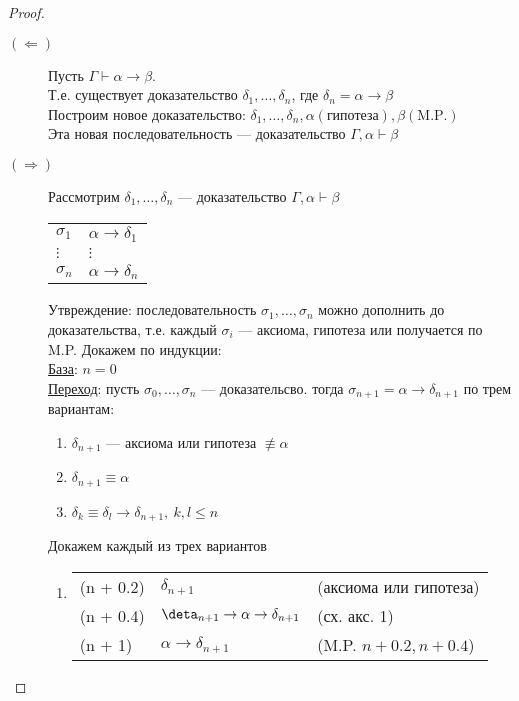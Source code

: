 \documentclass[oneside]{book}
\theoremstyle{plain}
\theoremstyle{remark}
\theoremstyle{definition}
\begin{document}
\begin{proof}
\-
\begin{description}
\item[{\((\Leftarrow)\)}] Пусть \(\Gamma \vdash \alpha \to \beta\). \\
Т.е. существует доказательство \(\delta_1, \dots, \delta_n\), где \(\delta_n = \alpha \to \beta\) \\
Построим новое доказательство: \(\delta_1, \dots, \delta_n, \alpha(\text{гипотеза}), \beta(\text{M.P.})\) \\
Эта новая последовательность --- доказательство \(\Gamma, \alpha \vdash \beta\)
\item[{\((\Rightarrow)\)}] Рассмотрим \(\delta_1, \dots, \delta_n\) --- доказательство \(\Gamma, \alpha \vdash \beta\)
\begin{center}
\begin{tabular}{ll}
\(\sigma_1\) & \(\alpha \to \delta_1\)\\
\(\vdots\) & \(\vdots\)\\
\(\sigma_n\) & \(\alpha \to \delta_n\)\\
\end{tabular}
\end{center}
Утвреждение: последовательность \(\sigma_1, \dots, \sigma_n\) можно дополнить до доказательства, т.е. каждый \(\sigma_i\) --- аксиома, гипотеза или получается по M.P. Докажем по индукции: \\
\uline{База}: \(n = 0\) \\
\uline{Переход}: пусть \(\sigma_0, \dots, \sigma_n\) --- доказательсво. тогда \(\sigma_{n + 1} = \alpha \to \delta_{n + 1}\) по трем вариантам:
\begin{enumerate}
\item \(\delta_{n + 1}\) --- аксиома или гипотеза \(\not\equiv \alpha\)
\item \(\delta_{n + 1} \equiv \alpha\)
\item \(\delta_k \equiv \delta_l \to \delta_{n + 1},\ k,l\le n\)
\end{enumerate}
Докажем каждый из трех вариантов
\begin{enumerate}
\item \-
\begin{center}
\begin{tabular}{l|ll}
(n + 0.2) & \(\delta_{n + 1}\) & (аксиома или гипотеза)\\
(n + 0.4) & \(\deta_{n + 1} \to \alpha \to \delta_{n + 1}\) & (сх. акс. 1)\\
(n + 1) & \(\alpha \to \delta_{n + 1}\) & (M.P. \(n + 0.2, n + 0.4\))\\

\end{tabular}
\end{center}
\end{enumerate}
\end{description}
\end{proof}
\end{document}
